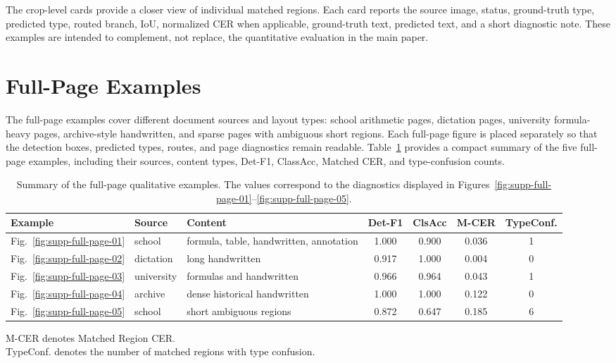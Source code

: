 \documentclass[runningheads]{llncs}
\renewcommand{\arraystretch}{1.10}
\begin{document}
The crop-level cards provide a closer view of individual matched regions. Each card reports the source image, status, ground-truth type, predicted type, routed branch, IoU, normalized CER when applicable, ground-truth text, predicted text, and a short diagnostic note. These examples are intended to complement, not replace, the quantitative evaluation in the main paper.

\section{Full-Page Examples}
\label{sec:full-page}

The full-page examples cover different document sources and layout types: school arithmetic pages, dictation pages, university formula-heavy pages, archive-style handwritten, and sparse pages with ambiguous short regions. Each full-page figure is placed separately so that the detection boxes, predicted types, routes, and page diagnostics remain readable. Table~\ref{tab:full-page-summary} provides a compact summary of the five full-page examples, including their sources, content types, Det-F1, ClassAcc, Matched CER, and type-confusion counts.

\begin{table}[H]
\centering
\scriptsize
\caption{Summary of the full-page qualitative examples. The values correspond to the diagnostics displayed in Figures~\ref{fig:supp-full-page-01}--\ref{fig:supp-full-page-05}.}
\label{tab:full-page-summary}

\setlength{\tabcolsep}{2.2pt}
\renewcommand{\arraystretch}{1.12}

\begin{tabularx}{\linewidth}{@{}llXcccc@{}}
\toprule
Example & Source & Content & Det-F1 & ClsAcc & M-CER & TypeConf. \\
\midrule
Fig.~\ref{fig:supp-full-page-01}
& school
& formula, table, handwritten, annotation
& 1.000 & 0.900 & 0.036 & 1 \\

Fig.~\ref{fig:supp-full-page-02}
& dictation
& long handwritten
& 0.917 & 1.000 & 0.004 & 0 \\

Fig.~\ref{fig:supp-full-page-03}
& university
& formulas and handwritten
& 0.966 & 0.964 & 0.043 & 1 \\

Fig.~\ref{fig:supp-full-page-04}
& archive
& dense historical handwritten
& 1.000 & 1.000 & 0.122 & 0 \\

Fig.~\ref{fig:supp-full-page-05}
& school
& short ambiguous regions
& 0.872 & 0.647 & 0.185 & 6 \\
\bottomrule
\end{tabularx}

\vspace{0.35em}
\begin{minipage}{\linewidth}
\scriptsize
\raggedright
M-CER denotes Matched Region CER. \\
TypeConf. denotes the number of matched regions with type confusion.
\end{minipage}
\end{table}
\end{document}

